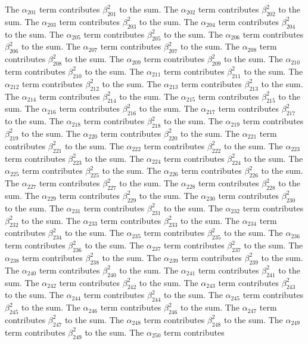 \begin{lemma}
The $\alpha_{201}$ term contributes $\beta_{201}^{2}$ to the sum. The $\alpha_{202}$ term contributes $\beta_{202}^{2}$ to the sum. The $\alpha_{203}$ term contributes $\beta_{203}^{2}$ to the sum. The $\alpha_{204}$ term contributes $\beta_{204}^{2}$ to the sum. The $\alpha_{205}$ term contributes $\beta_{205}^{2}$ to the sum. The $\alpha_{206}$ term contributes $\beta_{206}^{2}$ to the sum. The $\alpha_{207}$ term contributes $\beta_{207}^{2}$ to the sum. The $\alpha_{208}$ term contributes $\beta_{208}^{2}$ to the sum. The $\alpha_{209}$ term contributes $\beta_{209}^{2}$ to the sum. The $\alpha_{210}$ term contributes $\beta_{210}^{2}$ to the sum. The $\alpha_{211}$ term contributes $\beta_{211}^{2}$ to the sum. The $\alpha_{212}$ term contributes $\beta_{212}^{2}$ to the sum. The $\alpha_{213}$ term contributes $\beta_{213}^{2}$ to the sum. The $\alpha_{214}$ term contributes $\beta_{214}^{2}$ to the sum. The $\alpha_{215}$ term contributes $\beta_{215}^{2}$ to the sum. The $\alpha_{216}$ term contributes $\beta_{216}^{2}$ to the sum. The $\alpha_{217}$ term contributes $\beta_{217}^{2}$ to the sum. The $\alpha_{218}$ term contributes $\beta_{218}^{2}$ to the sum. The $\alpha_{219}$ term contributes $\beta_{219}^{2}$ to the sum. The $\alpha_{220}$ term contributes $\beta_{220}^{2}$ to the sum. The $\alpha_{221}$ term contributes $\beta_{221}^{2}$ to the sum. The $\alpha_{222}$ term contributes $\beta_{222}^{2}$ to the sum. The $\alpha_{223}$ term contributes $\beta_{223}^{2}$ to the sum. The $\alpha_{224}$ term contributes $\beta_{224}^{2}$ to the sum. The $\alpha_{225}$ term contributes $\beta_{225}^{2}$ to the sum. The $\alpha_{226}$ term contributes $\beta_{226}^{2}$ to the sum. The $\alpha_{227}$ term contributes $\beta_{227}^{2}$ to the sum. The $\alpha_{228}$ term contributes $\beta_{228}^{2}$ to the sum. The $\alpha_{229}$ term contributes $\beta_{229}^{2}$ to the sum. The $\alpha_{230}$ term contributes $\beta_{230}^{2}$ to the sum. The $\alpha_{231}$ term contributes $\beta_{231}^{2}$ to the sum. The $\alpha_{232}$ term contributes $\beta_{232}^{2}$ to the sum. The $\alpha_{233}$ term contributes $\beta_{233}^{2}$ to the sum. The $\alpha_{234}$ term contributes $\beta_{234}^{2}$ to the sum. The $\alpha_{235}$ term contributes $\beta_{235}^{2}$ to the sum. The $\alpha_{236}$ term contributes $\beta_{236}^{2}$ to the sum. The $\alpha_{237}$ term contributes $\beta_{237}^{2}$ to the sum. The $\alpha_{238}$ term contributes $\beta_{238}^{2}$ to the sum. The $\alpha_{239}$ term contributes $\beta_{239}^{2}$ to the sum. The $\alpha_{240}$ term contributes $\beta_{240}^{2}$ to the sum. The $\alpha_{241}$ term contributes $\beta_{241}^{2}$ to the sum. The $\alpha_{242}$ term contributes $\beta_{242}^{2}$ to the sum. The $\alpha_{243}$ term contributes $\beta_{243}^{2}$ to the sum. The $\alpha_{244}$ term contributes $\beta_{244}^{2}$ to the sum. The $\alpha_{245}$ term contributes $\beta_{245}^{2}$ to the sum. The $\alpha_{246}$ term contributes $\beta_{246}^{2}$ to the sum. The $\alpha_{247}$ term contributes $\beta_{247}^{2}$ to the sum. The $\alpha_{248}$ term contributes $\beta_{248}^{2}$ to the sum. The $\alpha_{249}$ term contributes $\beta_{249}^{2}$ to the sum. The $\alpha_{250}$ term contributes 
\end{lemma}
